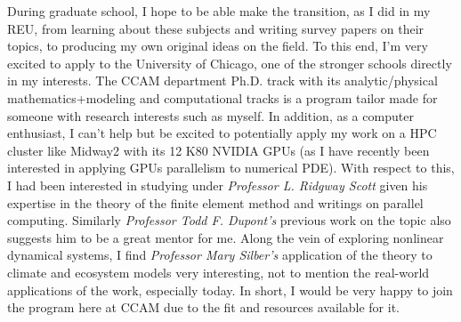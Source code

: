 \documentclass[11pt]{article}
\begin{document}
During graduate school, I hope to be able make the transition, as I did in my
REU, from learning about these subjects and writing survey papers on their
topics, to producing my own original ideas on the field. To this end, I'm very
excited to apply to the University of Chicago, one of the stronger schools
directly in my interests. The CCAM department Ph.D. track with its
analytic/physical mathematics+modeling and computational tracks is a program
tailor made for someone with research interests such as myself. In addition, as
a computer enthusiast, I can't help but be excited to potentially apply my work
on a HPC cluster like Midway2 with its 12 K80 NVIDIA GPUs (as I have recently
been interested in applying GPUs parallelism to numerical PDE). With respect to
this, I had been interested in studying under {\em Professor L. Ridgway Scott}
given his expertise in the theory of the finite element method and writings on
parallel computing. Similarly {\em Professor Todd F. Dupont's} previous work on
the topic also suggests him to be a great mentor for me. Along the vein of
exploring nonlinear dynamical systems, I find {\em Professor Mary Silber's}
application of the theory to climate and ecosystem models very interesting, not
to mention the real-world applications of the work, especially today. In short,
I would be very happy to join the program here at CCAM due to the fit and
resources available for it.
\end{document}

